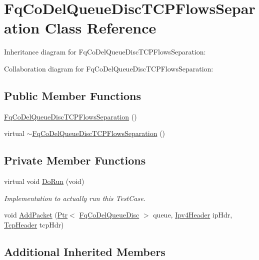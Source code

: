 \hypertarget{classFqCoDelQueueDiscTCPFlowsSeparation}{}\section{Fq\+Co\+Del\+Queue\+Disc\+T\+C\+P\+Flows\+Separation Class Reference}
\label{classFqCoDelQueueDiscTCPFlowsSeparation}


Inheritance diagram for Fq\+Co\+Del\+Queue\+Disc\+T\+C\+P\+Flows\+Separation\+:


Collaboration diagram for Fq\+Co\+Del\+Queue\+Disc\+T\+C\+P\+Flows\+Separation\+:
\subsection*{Public Member Functions}
\begin{DoxyCompactItemize}
\item 
\hyperlink{classFqCoDelQueueDiscTCPFlowsSeparation_a961798ab062a4169f7070fb5d040c70d}{Fq\+Co\+Del\+Queue\+Disc\+T\+C\+P\+Flows\+Separation} ()
\item 
virtual \hyperlink{classFqCoDelQueueDiscTCPFlowsSeparation_a26afba5fd71753d88431378b005f665c}{$\sim$\+Fq\+Co\+Del\+Queue\+Disc\+T\+C\+P\+Flows\+Separation} ()
\end{DoxyCompactItemize}
\subsection*{Private Member Functions}
\begin{DoxyCompactItemize}
\item 
virtual void \hyperlink{classFqCoDelQueueDiscTCPFlowsSeparation_aedd5fa8cebf49f8414f9fd1856313887}{Do\+Run} (void)
\begin{DoxyCompactList}\small\item\em Implementation to actually run this Test\+Case. \end{DoxyCompactList}\item 
void \hyperlink{classFqCoDelQueueDiscTCPFlowsSeparation_ae3d3e59d786d4cc53a9140ac1a870a4b}{Add\+Packet} (\hyperlink{classns3_1_1Ptr}{Ptr}$<$ \hyperlink{classns3_1_1FqCoDelQueueDisc}{Fq\+Co\+Del\+Queue\+Disc} $>$ queue, \hyperlink{classns3_1_1Ipv4Header}{Ipv4\+Header} ip\+Hdr, \hyperlink{classns3_1_1TcpHeader}{Tcp\+Header} tcp\+Hdr)
\end{DoxyCompactItemize}
\subsection*{Additional Inherited Members}


